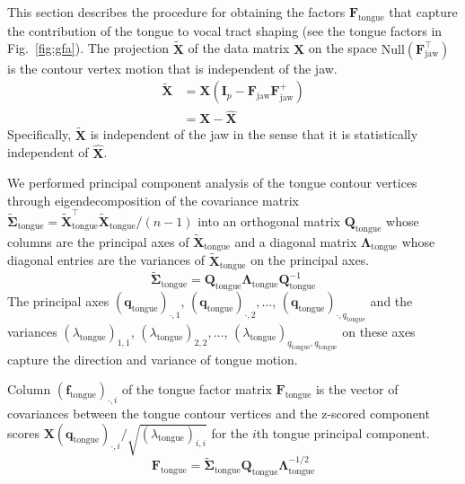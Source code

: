 \documentclass[preprint]{JASAnew}\usepackage[]{graphicx}\usepackage[]{color}
\begin{document}
This section describes the procedure for obtaining the factors $\mathbf{F}_\text{tongue}$ that capture the contribution of the tongue to vocal tract shaping  (see the tongue factors in Fig.~\ref{fig:gfa}). 
% 
The projection $\mathbf{\tilde{X}}$ of the data matrix $\mathbf{X}$ on the space $\mathrm{Null}(\mathbf{F}_\text{jaw}^\intercal)$ is the contour vertex motion that is independent of the jaw.
%
\begin{align} \label{eq:XXX}
\mathbf{\tilde{X}} 
&= \mathbf{X} \left( \mathbf{I}_p - \mathbf{F}_\text{jaw}\mathbf{F}_\text{jaw}^+ \right) \\
&= \mathbf{X} - \mathbf{\hat{X}} 
\end{align}
%
Specifically, $\mathbf{\tilde{X}}$ is independent of the jaw in the sense that it is statistically independent of $\mathbf{\hat{X}}$. 
%





We performed principal component analysis of the tongue contour vertices through eigendecomposition of the covariance matrix $\boldsymbol{\tilde{\Sigma}}_\text{tongue} = \mathbf{\tilde{X}}_\text{tongue}^\intercal \mathbf{\tilde{X}}_\text{tongue}/(n-1)$ into an orthogonal matrix $\mathbf{Q}_\text{tongue}$ whose columns are the principal axes of $\mathbf{\tilde{X}}_\text{tongue}$ and a diagonal matrix $\boldsymbol{\Lambda}_\text{tongue}$ whose diagonal entries are the variances of $\mathbf{\tilde{X}}_\text{tongue}$ on the principal axes.
% 
\begin{equation}
\boldsymbol{\tilde{\Sigma}}_\text{tongue} = \mathbf{Q}_\text{tongue} \boldsymbol{\Lambda}_\text{tongue} \mathbf{Q}_\text{tongue}^{-1}
\end{equation}
%
The principal axes $(\mathbf{q}_\text{tongue})_{\cdot,1}$, $(\mathbf{q}_\text{tongue})_{\cdot,2}, \ldots$, $(\mathbf{q}_\text{tongue})_{\cdot,q_\text{tongue}}$ and the variances $(\lambda_\text{tongue})_{1,1}$, $(\lambda_\text{tongue})_{2,2}, \ldots$, $(\lambda_\text{tongue})_{q_\text{tongue},q_\text{tongue}}$ on these axes capture the direction and variance of tongue motion.


Column $(\mathbf{f}_\text{tongue})_{\cdot,i}$ of the tongue factor matrix $\mathbf{F}_\text{tongue}$ is the vector of covariances between the tongue contour vertices and the z-scored component scores $\mathbf{X} (\mathbf{q}_\text{tongue})_{\cdot,i} / \sqrt{(\lambda_\text{tongue})_{i,i}}$ for the $i$th tongue principal component. 
%
\begin{equation}
\mathbf{F}_\text{tongue}
 = \boldsymbol{\tilde{\Sigma}}_\text{tongue} \mathbf{Q}_\text{tongue} \boldsymbol{\Lambda}_\text{tongue}^{-1/2}
\end{equation}
\end{document}
